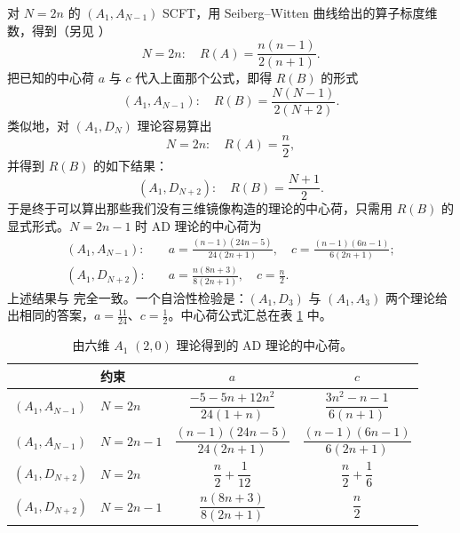 
对 $N=2n$ 的 $(A_1,A_{N-1})$ SCFT，用 Seiberg--Witten 曲线给出的算子标度维数，得到（另见 \cite{42}）
\begin{equation}
N = 2n:\quad R(A) = \frac{n(n-1)}{2(n+1)}.
\label{eq:4.15}\tag{4.15}
\end{equation}
把已知的中心荷 $a$ 与 $c$ 代入上面那个公式，即得 $R(B)$ 的形式
\begin{equation}
(A_1,A_{N-1}):\quad R(B) = \frac{N(N-1)}{2(N+2)}.
\label{eq:4.16}\tag{4.16}
\end{equation}
类似地，对 $(A_1,D_N)$ 理论容易算出
\begin{equation}
N = 2n:\quad R(A) = \frac{n}{2},
\label{eq:4.17}\tag{4.17}
\end{equation}
并得到 $R(B)$ 的如下结果：
\begin{equation}
(A_1,D_{N+2}):\quad R(B) = \frac{N+1}{2}.
\label{eq:4.18}\tag{4.18}
\end{equation}
于是终于可以算出那些我们没有三维镜像构造的理论的中心荷，只需用 $R(B)$ 的显式形式。$N=2n-1$ 时 AD 理论的中心荷为
\begin{equation}
\begin{aligned}
(A_1,A_{N-1}):\quad & a = \frac{(n-1)(24n-5)}{24(2n+1)},\quad c = \frac{(n-1)(6n-1)}{6(2n+1)};\\
(A_1,D_{N+2}):\quad & a = \frac{n(8n+3)}{8(2n+1)},\quad c = \frac{n}{2}.
\end{aligned}
\label{eq:4.19}\tag{4.19}
\end{equation}
上述结果与 \cite{20,42} 完全一致。一个自洽性检验是：$(A_1,D_3)$ 与 $(A_1,A_3)$ 两个理论给出相同的答案，$a=\tfrac{11}{24}$、$c=\tfrac{1}{2}$。中心荷公式汇总在表 \ref{tab:3} 中。

\begin{table}[tbp]
\centering
\caption{由六维 $A_1$ $(2,0)$ 理论得到的 AD 理论的中心荷。}
\label{tab:3}
\begin{tabular}{llcc}
\toprule
 & 约束 & $a$ & $c$\\
\midrule
$(A_1,A_{N-1})$ & $N=2n$   & $\dfrac{-5-5n+12n^2}{24(1+n)}$ & $\dfrac{3n^2-n-1}{6(n+1)}$\\[6pt]
$(A_1,A_{N-1})$ & $N=2n-1$ & $\dfrac{(n-1)(24n-5)}{24(2n+1)}$ & $\dfrac{(n-1)(6n-1)}{6(2n+1)}$\\[6pt]
$(A_1,D_{N+2})$ & $N=2n$   & $\dfrac{n}{2}+\dfrac{1}{12}$ & $\dfrac{n}{2}+\dfrac{1}{6}$\\[6pt]
$(A_1,D_{N+2})$ & $N=2n-1$ & $\dfrac{n(8n+3)}{8(2n+1)}$ & $\dfrac{n}{2}$\\
\bottomrule
\end{tabular}
\end{table}

